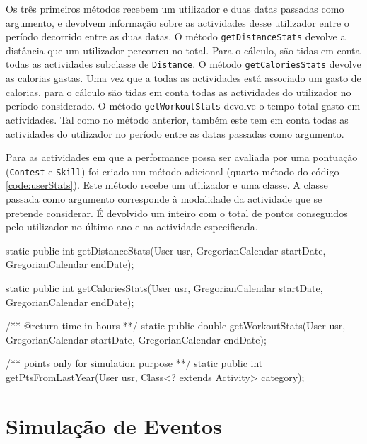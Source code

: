 \documentclass[a4paper,10pt]{report}
\begin{document}
Os três primeiros métodos recebem um utilizador e duas datas passadas como argumento, e devolvem informação sobre as actividades desse utilizador 
entre o período decorrido entre as duas datas.
O método \verb!getDistanceStats! devolve a distância que um utilizador percorreu no total. 
Para o cálculo, são tidas em conta todas as actividades subclasse de \verb!Distance!.
O método \verb!getCaloriesStats! devolve as calorias gastas. 
Uma vez que a todas as actividades está associado um gasto de calorias, para o cálculo são tidas em conta todas 
as actividades do utilizador no período considerado.
O método \verb!getWorkoutStats! devolve o tempo total gasto em actividades. 
Tal como no método anterior, também este tem em conta todas as actividades do utilizador no período entre as datas passadas como argumento.

Para as actividades em que a performance possa ser avaliada por uma pontuação (\verb!Contest! e \verb!Skill!) foi criado um método adicional 
(quarto método do código \ref{code:userStats}).
Este método recebe um utilizador e uma classe. A classe passada como argumento corresponde à modalidade da actividade que se pretende considerar. 
É devolvido um inteiro com o total de pontos conseguidos pelo utilizador no último ano e na actividade especificada.

\begin{code}[caption=Métodos para cálculo de estatísticas (src/core/UserStats)., label=code:userStats]
static public int getDistanceStats(User usr, GregorianCalendar startDate, GregorianCalendar endDate);

static public int getCaloriesStats(User usr, GregorianCalendar startDate, GregorianCalendar endDate);

/** @return time in hours **/
static public double getWorkoutStats(User usr, GregorianCalendar startDate, GregorianCalendar endDate);
  
/** points only for simulation purpose **/
static public int getPtsFromLastYear(User usr, Class<? extends Activity> category);
\end{code}



\chapter{Simulação de Eventos}
\label{cap:simula}
\end{document}
